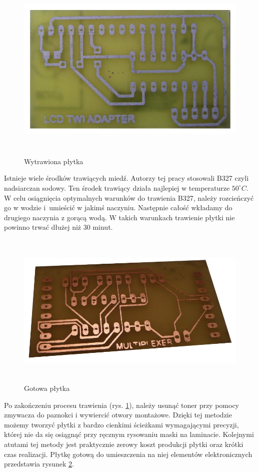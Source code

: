 \begin{figure}[!ht]
 \centering
 \includegraphics[height=90mm]{../images/appendix/wytrawiona.JPG}
 \caption{Wytrawiona płytka}
 \label{fig:WytrawionaPlytka}
\end{figure}

Istnieje wiele środków trawiących miedź. Autorzy tej pracy stosowali B327 czyli
nadsiarczan sodowy. Ten środek trawiący działa najlepiej w temperaturze
$50^{\circ}C$. W celu osiągnięcia optymalnych warunków do trawienia B327, należy
rozcieńczyć go w wodzie i~umieścić w jakimś naczyniu. Następnie całość wkładamy
do drugiego naczynia z gorącą wodą. W takich warunkach trawienie płytki nie
powinno trwać dłużej niż 30 minut.\newpage

\begin{figure}[!ht]
 \centering
 \includegraphics[height=75mm]{../images/appendix/gotowa.JPG}
 \caption{Gotowa płytka}
 \label{fig:GotowaPlytka}
\end{figure}

Po zakończeniu procesu trawienia (rys. \ref{fig:WytrawionaPlytka}), należy usunąć
toner przy pomocy zmywacza do paznokci i wywiercić otwory montażowe. Dzięki tej
metodzie możemy tworzyć płytki z bardzo cienkimi ścieżkami wymagającymi precyzji,
której nie da się osiągnąć przy ręcznym rysowaniu maski na laminacie. Kolejnymi
atutami tej metody jest praktycznie zerowy koszt produkcji płytki oraz krótki
czas realizacji. Płytkę gotową do umieszczenia na niej elementów elektronicznych
przedstawia rysunek \ref{fig:GotowaPlytka}.
